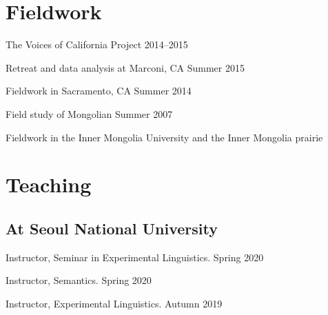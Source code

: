 \documentclass[letterpaper]{article}
\renewenvironment{itemize}{
  \begin{list}{}{
    \setlength{\leftmargin}{1.5em}
  }
}{
  \end{list}
}
\begin{document}
\section*{Fieldwork}

\begin{itemize}\itemsep -1pt

\item The Voices of California Project \hfill 2014--2015

\vspace{-0.08in}

\begin{itemize}\itemsep -1pt
\item Retreat and data analysis at Marconi, CA \hfill Summer 2015

\item Fieldwork in Sacramento, CA \hfill Summer 2014
\end{itemize}

\vspace{-0.08in}

\item Field study of Mongolian \hfill Summer 2007

\vspace{-0.08in}

\begin{itemize}
\item Fieldwork in the Inner Mongolia University and the Inner Mongolia prairie 
\end{itemize}

\end{itemize}


\section*{Teaching}

\subsection*{At Seoul National University}

\begin{itemize}\itemsep -1pt
\item Instructor, Seminar in Experimental Linguistics. \hfill Spring 2020
\item Instructor, Semantics. \hfill Spring 2020
\item Instructor, Experimental Linguistics. \hfill Autumn 2019

\end{itemize}
\end{document}
